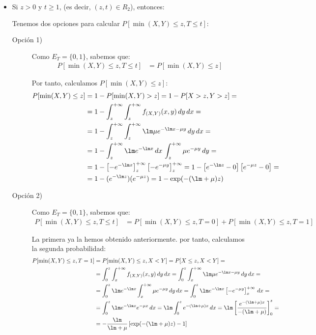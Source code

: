 \begin{ejercicio}
\begin{itemize}
        \item Si $z>0$ y $t\geq 1$, (es decir, $(z,t)\in R_2$), entonces:
        
        Tenemos dos opciones para calcular $P[\min(X,Y)\leq z,T\leq t]$:
        \begin{description}
            \item[Opción 1)] Como $E_T=\{0,1\}$, sabemos que:
            \begin{align*}
                P[\min(X,Y)\leq z,T\leq t]&=P[\min(X,Y)\leq z]
            \end{align*}

            Por tanto, calculamos $P[\min(X,Y)\leq z]$:
            \begin{align*}
                P[\min(X,Y)\leq z] &= 1-P[\min(X,Y)>z] = 1-P[X>z,Y>z]
                =\\&= 1-\int_{z}^{+\infty}\int_{z}^{+\infty} f_{(X,Y)}(x,y) \, dy \, dx
                =\\&= 1-\int_{z}^{+\infty}\int_{z}^{+\infty} \lm\mu e^{-\lm x-\mu y} \, dy \, dx
                =\\&= 1-\int_{z}^{+\infty}\lm e^{-\lm x}\, dx \, \int_{z}^{+\infty} \mu e^{-\mu y} \, dy
                =\\&= 1-\left[-e^{-\lm x}\right]_{z}^{+\infty}\left[-e^{-\mu y}\right]_{z}^{+\infty}
                = 1-\left[e^{-\lm z}-0\right]\left[e^{-\mu z}-0\right]
                =\\&= 1-(e^{-\lm z})(e^{-\mu z})
                = 1-\exp(-(\lm+\mu)z)
            \end{align*}

            \item[Opción 2)] Como $E_T=\{0,1\}$, sabemos que:
            \begin{align*}
                P[\min(X,Y)\leq z,T\leq t]&=P[\min(X,Y)\leq z,T=0] + P[\min(X,Y)\leq z,T=1]
            \end{align*}

            La primera ya la hemos obtenido anteriormente. por tanto, calculamos la segunda probabilidad:
            \begin{align*}
                P[\min(X,Y)\leq z,T=1]&=P[\min(X,Y)\leq z,X<Y] = P[X\leq z,X<Y]
                =\\&= \int_{0}^{z}\int_{x}^{+\infty} f_{(X,Y)}(x,y) \, dy \, dx
                = \int_{0}^{z}\int_{x}^{+\infty} \lm\mu e^{-\lm x-\mu y} \, dy \, dx
                =\\&= \int_{0}^{z}\lm e^{-\lm x}\int_{x}^{+\infty} \mu e^{-\mu y} \, dy \, dx
                = \int_{0}^{z}\lm e^{-\lm x}\left[-e^{-\mu y}\right]_{x}^{+\infty} \, dx
                =\\&= \int_{0}^{z}\lm e^{-\lm x}e^{-\mu x} \, dx
                = \lm\int_{0}^{z} e^{-(\lm+\mu)x} \, dx
                = \lm\left[\dfrac{e^{-(\lm+\mu)x}}{-(\lm+\mu)}\right]_{0}^{z}
                =\\&= -\dfrac{\lm}{\lm+\mu} \left[\exp(-(\lm+\mu)z)-1\right]
            \end{align*}


\end{description}
\end{itemize}
\end{ejercicio}
